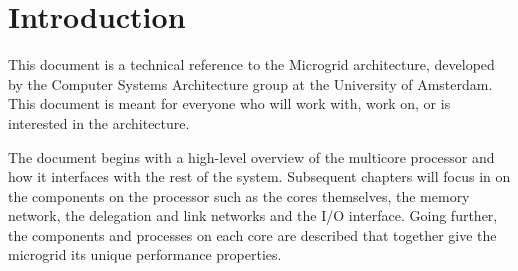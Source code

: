 \chapter{\label{chapter:intro}Introduction}

This document is a technical reference to the Microgrid architecture, developed by the Computer Systems Architecture group at the University of Amsterdam. This document is meant for everyone who will work with, work on, or is interested in the architecture.

The document begins with a high-level overview of the multicore processor and how it interfaces with the rest of the system. Subsequent chapters will focus in on the components on the processor such as the cores themselves, the memory network, the delegation and link networks and the I/O interface. Going further, the components and processes on each core are described that together give the microgrid its unique performance properties.
